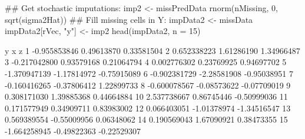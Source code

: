 \begin{Schunk}
\begin{Sinput}
 ## Get stochastic imputations:
 imp2 <- missPredData %*% betaHat + 
   rnorm(nMissing, 0, sqrt(sigma2Hat))
 ## Fill missing cells in Y:
 impData2 <- missData
 impData2[rVec, "y"] <- imp2
 head(impData2, n = 15)
\end{Sinput}
\begin{Soutput}
              y           x           z
1  -0.955853846  0.49613870  0.33581504
2   0.652338223  1.61286190  1.34966487
3  -0.217042800  0.93579168  0.21064794
4   0.002776302  0.23769925  0.94697702
5  -1.370947139 -1.17814972 -0.75915089
6  -0.902381729 -2.28581908 -0.95038951
7  -0.160416265 -0.37806412  1.22899733
8  -0.600078567 -0.08573622 -0.07709019
9   0.308171030  1.39885368  0.44664884
10  2.537738667  0.86745446 -0.50999036
11  0.171577949  0.34909711  0.83983002
12  0.066403051 -1.01378974 -1.34516547
13  0.569389554 -0.55009956  0.06348062
14  0.190569043  1.67090921  0.38473355
15 -1.664258945 -0.49822363 -0.22529307
\end{Soutput}
\end{Schunk}
